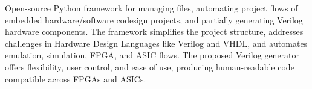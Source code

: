 %

Open-source Python framework for managing files, automating
project flows of embedded hardware/software codesign projects, and partially generating Verilog
hardware components. The framework simplifies the project structure, addresses challenges in
Hardware Design Languages like Verilog and VHDL, and automates emulation, simulation,
FPGA, and ASIC flows. The proposed Verilog generator offers flexibility, user control, and ease
of use, producing human-readable code compatible across FPGAs and ASICs.
